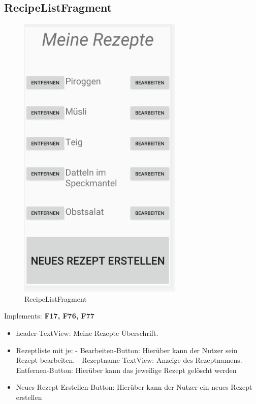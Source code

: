 \subsection{RecipeListFragment}
\begin{figure}[H]
	\centering
	\includegraphics[width=0.7\textwidth]{pics/recipelistFragment.png}%
	\caption{RecipeListFragment}%
	\label{view}%
\end{figure}

Implements: \textbf{F17, F76, F77}

\begin{itemize}[nosep]
	\item header-TextView: Meine Rezepte Überschrift.
	\item  Rezeptliste mit je:
	\subitem	- Bearbeiten-Button: Hierüber kann der Nutzer sein Rezept bearbeiten.
	\subitem	- Rezeptname-TextView: Anzeige des Rezeptnamens.
	\subitem	- Entfernen-Button: Hierüber kann das jeweilige Rezept gelöscht werden
	\item 	Neues Rezept Erstellen-Button: Hierüber kann der Nutzer ein neues Rezept erstellen 
\end{itemize}



